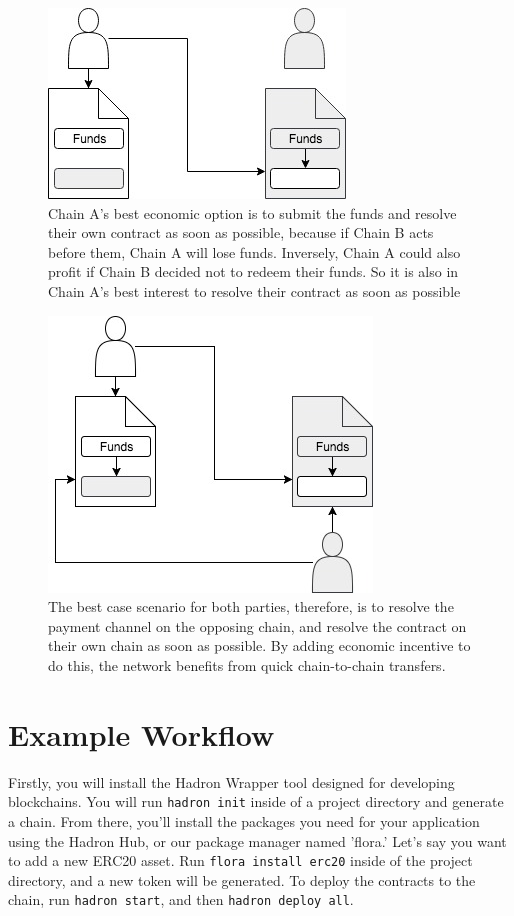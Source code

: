 \documentclass{%
	article}
\begin{document}
\begin{figure}[htbp!]
\centering
\includegraphics[scale=0.5]{fig5.jpg}
\caption{Chain A's best economic option is to submit the funds and resolve their own contract as soon as possible, because if Chain B acts before them, Chain A will lose funds. Inversely, Chain A could also profit if Chain B decided not to redeem their funds. So it is also in Chain A's best interest to resolve their contract as soon as possible}
\end{figure}

\begin{figure}[htbp!]
\centering
\includegraphics[scale=0.5]{fig6.jpg}
\caption{The best case scenario for both parties, therefore, is to resolve the payment channel on the opposing chain, and resolve the contract on their own chain as soon as possible. By adding economic incentive to do this, the network benefits from quick chain-to-chain transfers.}
\end{figure}

\section{Example Workflow}
Firstly, you will install the Hadron Wrapper tool designed for developing blockchains. You will run \texttt{hadron init} inside of a project directory and generate a chain. From there, you'll install the packages you need for your application using the Hadron Hub, or our package manager named 'flora.' Let's say you want to add a new ERC20 asset. Run \texttt{flora install erc20} inside of the project directory, and a new token will be generated. To deploy the contracts to the chain, run \texttt{hadron start}, and then \texttt{hadron deploy all}.
\end{document}
